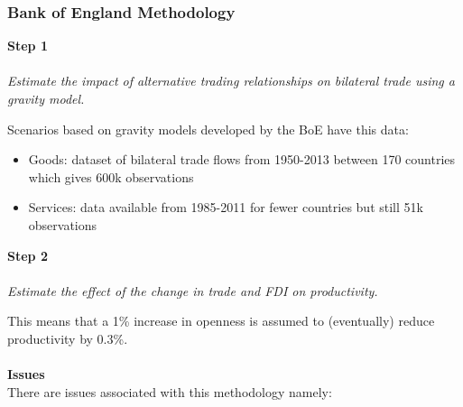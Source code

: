 \documentclass[12pt, letterpaper]{article}
\begin{document}
\subsubsection{Bank of England Methodology}
\textbf{Step 1}\\\\
\textit{Estimate the impact of alternative trading relationships on bilateral trade using a gravity model.}
\begin{center}
	\noindent{}
\end{center}
Scenarios based on gravity models developed by the BoE have this data:
\begin{itemize}
	\item Goods: dataset of bilateral trade flows from 1950-2013 between 170 countries which gives 600k observations
	\item Services: data available from 1985-2011 for fewer countries but still 51k observations
\end{itemize}
\noindent\textbf{Step 2}\\\\
\textit{Estimate the effect of the change in trade and FDI on productivity.}
\begin{center}
	\noindent{}
\end{center}
This means that a 1\% increase in openness is assumed to (eventually) reduce productivity by 0.3\%.\\\\
\textbf{Issues}\\
There are issues associated with this methodology namely:
\end{document}
